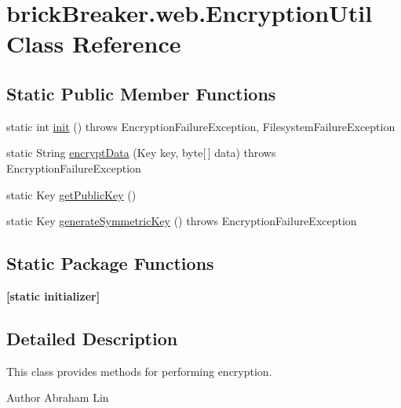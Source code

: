 \hypertarget{classbrick_breaker_1_1web_1_1_encryption_util}{
\section{brickBreaker.web.EncryptionUtil Class Reference}
\label{classbrick_breaker_1_1web_1_1_encryption_util}
}
\subsection*{Static Public Member Functions}
\begin{DoxyCompactItemize}
\item 
static int \hyperlink{classbrick_breaker_1_1web_1_1_encryption_util_a3504c386ef5a1beb2410a140fa641b1f}{init} ()  throws EncryptionFailureException, 			FilesystemFailureException 
\item 
static String \hyperlink{classbrick_breaker_1_1web_1_1_encryption_util_ae0698d40ded2bf0a720b0c4720b9a79e}{encryptData} (Key key, byte\mbox{[}$\,$\mbox{]} data)  throws EncryptionFailureException 
\item 
static Key \hyperlink{classbrick_breaker_1_1web_1_1_encryption_util_ac1c5c210199ba00750b5dd06845cb784}{getPublicKey} ()
\item 
static Key \hyperlink{classbrick_breaker_1_1web_1_1_encryption_util_abcaff8736b7a22264577aa8a992733b2}{generateSymmetricKey} ()  throws EncryptionFailureException 
\end{DoxyCompactItemize}
\subsection*{Static Package Functions}
\begin{DoxyCompactItemize}
\item 
\hypertarget{classbrick_breaker_1_1web_1_1_encryption_util_a8c24fabe20b012d5d453fbb22d5c322e}{
{\bfseries \mbox{[}static initializer\mbox{]}}}
\label{classbrick_breaker_1_1web_1_1_encryption_util_a8c24fabe20b012d5d453fbb22d5c322e}

\end{DoxyCompactItemize}


\subsection{Detailed Description}
This class provides methods for performing encryption.

\begin{DoxyAuthor}{Author}
Abraham Lin 
\end{DoxyAuthor}


